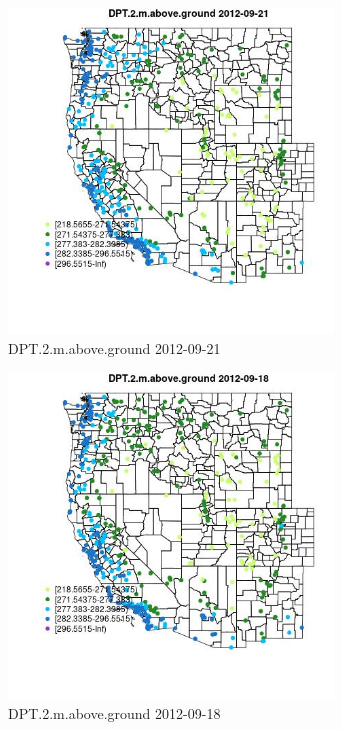 \begin{figure} 
\centering  
\includegraphics[width=0.77\textwidth]{Code_Outputs/Report_ML_input_PM25_Step4_part_e_de_duplicated_aves_compiled_2019-05-14wNAs_MapObsDPT2maboveground2012-09-21.jpg} 
\caption{\label{fig:Report_ML_input_PM25_Step4_part_e_de_duplicated_aves_compiled_2019-05-14wNAsMapObsDPT2maboveground2012-09-21}DPT.2.m.above.ground 2012-09-21} 
\end{figure} 
 

\begin{figure} 
\centering  
\includegraphics[width=0.77\textwidth]{Code_Outputs/Report_ML_input_PM25_Step4_part_e_de_duplicated_aves_compiled_2019-05-14wNAs_MapObsDPT2maboveground2012-09-18.jpg} 
\caption{\label{fig:Report_ML_input_PM25_Step4_part_e_de_duplicated_aves_compiled_2019-05-14wNAsMapObsDPT2maboveground2012-09-18}DPT.2.m.above.ground 2012-09-18} 
\end{figure} 
 

